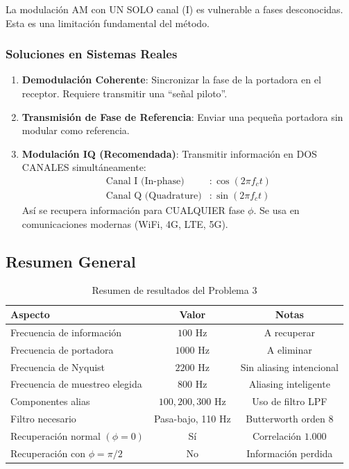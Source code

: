 \documentclass[12pt]{article}
\begin{document}
La modulación AM con UN SOLO canal (I) es vulnerable a fases desconocidas. Esta es una limitación fundamental del método.

\subsubsection*{Soluciones en Sistemas Reales}

\begin{enumerate}
\item \textbf{Demodulación Coherente}: Sincronizar la fase de la portadora en el receptor. Requiere transmitir una ``señal piloto''.

\item \textbf{Transmisión de Fase de Referencia}: Enviar una pequeña portadora sin modular como referencia.

\item \textbf{Modulación IQ (Recomendada)}: Transmitir información en DOS CANALES simultáneamente:
\begin{align}
\text{Canal I (In-phase)} &: \cos(2\pi f_c t) \\
\text{Canal Q (Quadrature)} &: \sin(2\pi f_c t)
\end{align}
Así se recupera información para CUALQUIER fase $\phi$.
Se usa en comunicaciones modernas (WiFi, 4G, LTE, 5G).
\end{enumerate}

\subsection*{Resumen General}

\begin{table}[H]
\centering
\begin{tabular}{lcc}
\toprule
\textbf{Aspecto} & \textbf{Valor} & \textbf{Notas} \\
\midrule
Frecuencia de información & $100$ Hz & A recuperar \\
Frecuencia de portadora & $1000$ Hz & A eliminar \\
Frecuencia de Nyquist & $2200$ Hz & Sin aliasing intencional \\
Frecuencia de muestreo elegida & $800$ Hz & Aliasing inteligente \\
Componentes alias & $100, 200, 300$ Hz & Uso de filtro LPF \\
Filtro necesario & Pasa-bajo, 110 Hz & Butterworth orden 8 \\
Recuperación normal $(\phi = 0)$ & Sí & Correlación $1.000$ \\
Recuperación con $\phi = \pi/2$ & No & Información perdida \\
\bottomrule
\end{tabular}
\caption{Resumen de resultados del Problema 3}
\end{table}
\end{document}
